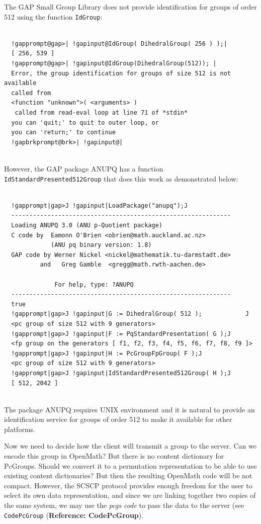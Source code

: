\documentclass[a4paper,11pt]{report}
\begin{document}
{{ The \textsf{GAP} Small Group Library does not provide identification for groups of order 512
using the function \texttt{IdGroup}: 
\begin{Verbatim}[commandchars=!@|,fontsize=\small,frame=single,label=Example]
  
  !gapprompt@gap>| !gapinput@IdGroup( DihedralGroup( 256 ) );|
  [ 256, 539 ]
  !gapprompt@gap>| !gapinput@IdGroup(DihedralGroup(512)); |
  Error, the group identification for groups of size 512 is not available 
  called from
  <function "unknown">( <arguments> )
   called from read-eval loop at line 71 of *stdin*
  you can 'quit;' to quit to outer loop, or
  you can 'return;' to continue
  !gapbrkprompt@brk>| !gapinput@|
  
\end{Verbatim}
 However, the \textsf{GAP} package \textsf{ANUPQ} \cite{ANUPQ} has a function \texttt{IdStandardPresented512Group} that does this work as demonstrated below: 
\begin{Verbatim}[commandchars=!|J,fontsize=\small,frame=single,label=Example]
  
  !gapprompt|gap>J !gapinput|LoadPackage("anupq");J
  -------------------------------------------------------------
  Loading ANUPQ 3.0 (ANU p-Quotient package)
  C code by  Eamonn O'Brien <obrien@math.auckland.ac.nz>
             (ANU pq binary version: 1.8)
  GAP code by Werner Nickel <nickel@mathematik.tu-darmstadt.de>
          and   Greg Gamble  <gregg@math.rwth-aachen.de>
  
              For help, type: ?ANUPQ
  -------------------------------------------------------------
  true
  !gapprompt|gap>J !gapinput|G := DihedralGroup( 512 );            J
  <pc group of size 512 with 9 generators>
  !gapprompt|gap>J !gapinput|F := PqStandardPresentation( G );J
  <fp group on the generators [ f1, f2, f3, f4, f5, f6, f7, f8, f9 ]>
  !gapprompt|gap>J !gapinput|H := PcGroupFpGroup( F );J
  <pc group of size 512 with 9 generators>
  !gapprompt|gap>J !gapinput|IdStandardPresented512Group( H );J
  [ 512, 2042 ]
  
\end{Verbatim}
 The package \textsf{ANUPQ} requires \textsf{UNIX} environment and it is natural to provide an identification service for groups
of order 512 to make it available for other platforms. 

 Now we need to decide how the client will transmit a group to the server. Can
we encode this group in \textsf{OpenMath}? But there is no content dictionary for PcGroups. Should we convert it to a
permutation representation to be able to use existing content dictionaries?
But then the resulting \textsf{OpenMath} code will be not compact. However, the \textsf{SCSCP} protocol provides enough freedom for the user to select its own data
representation, and since we are linking together two copies of the same
system, we may use the \emph{pcgs code} to pass the data to the server (see \texttt{CodePcGroup} (\textbf{Reference: CodePcGroup}). 

}}
\end{document}
